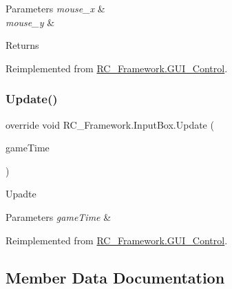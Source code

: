 \begin{DoxyParams}{Parameters}
{\em mouse\+\_\+x} & \\
\hline
{\em mouse\+\_\+y} & \\
\hline
\end{DoxyParams}
\begin{DoxyReturn}{Returns}

\end{DoxyReturn}


Reimplemented from \mbox{\hyperlink{class_r_c___framework_1_1_g_u_i___control_a005e7f109afd21abd6576fdf70212af5}{R\+C\+\_\+\+Framework.\+G\+U\+I\+\_\+\+Control}}.

\mbox{\label{class_r_c___framework_1_1_input_box_ac91004a57916d0f9f55a40c007cb72ce}} 
\subsubsection{\texorpdfstring{Update()}{Update()}}
{\footnotesize\ttfamily override void R\+C\+\_\+\+Framework.\+Input\+Box.\+Update (\begin{DoxyParamCaption}\item[{Game\+Time}]{game\+Time }\end{DoxyParamCaption})\hspace{0.3cm}{\ttfamily [virtual]}}



Upadte 


\begin{DoxyParams}{Parameters}
{\em game\+Time} & \\
\hline
\end{DoxyParams}


Reimplemented from \mbox{\hyperlink{class_r_c___framework_1_1_g_u_i___control_a7aa3b0b6ba141d995ca830ff99ae3003}{R\+C\+\_\+\+Framework.\+G\+U\+I\+\_\+\+Control}}.



\subsection{Member Data Documentation}
\mbox{\label{class_r_c___framework_1_1_input_box_a96345a99971dd664242c1f9c1e0231a7}} 
